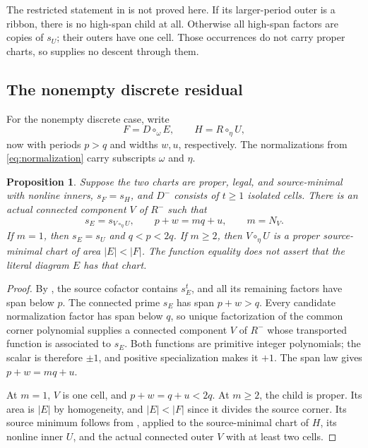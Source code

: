\documentclass[11pt,a4paper]{amsart}
\numberwithin{equation}{section}
\theoremstyle{plain}
\newtheorem{proposition}[theorem]{Proposition}
\theoremstyle{definition}
\begin{document}
The restricted statement in  is not proved here.  If its larger-period outer is a ribbon, there is no high-span child at all.  Otherwise all high-span factors are copies of \(s_U\); their outers have one cell.  Those occurrences do not carry proper charts, so  supplies no descent through them.

\subsection{The nonempty discrete residual}

For the nonempty discrete case, write
\begin{equation*}
 F=D\circ_\omega E,\qquad H=R\circ_\eta U,
\end{equation*}
now with periods \(p>q\) and widths \(w,u\), respectively.  The normalizations from \eqref{eq:normalization} carry subscripts \(\omega\) and \(\eta\).

\begin{proposition}\label{prop:beta-reduction}
Suppose the two charts are proper, legal, and source-minimal with nonline inners, \(s_F=s_H\), and \(D^-\) consists of \(t\ge1\) isolated cells.  There is an actual connected component \(V\) of \(R^-\) such that
\begin{equation*}
 s_E=s_{V\circ_\eta U},\qquad
 p+w=mq+u,\qquad m=N_V.
\end{equation*}
If \(m=1\), then \(s_E=s_U\) and \(q<p<2q\).  If \(m\ge2\), then \(V\circ_\eta U\) is a proper source-minimal chart of area \(|E|<|F|\).  The function equality does not assert that the literal diagram \(E\) has that chart.
\end{proposition}
\begin{proof}
By , the source cofactor contains \(s_E^t\), and all its remaining factors have span below \(p\).  The connected prime \(s_E\) has span \(p+w>q\).  Every candidate normalization factor has span below \(q\), so unique factorization of the common corner polynomial supplies a connected component \(V\) of \(R^-\) whose transported function is associated to \(s_E\).  Both functions are primitive integer polynomials; the scalar is therefore \(\pm1\), and positive specialization makes it \(+1\).  The span law gives \(p+w=mq+u\).

At \(m=1\), \(V\) is one cell, and \(p+w=q+u<2q\).  At \(m\ge2\), the child is proper.  Its area is \(|E|\) by homogeneity, and \(|E|<|F|\) since it divides the source corner.  Its source minimum follows from , applied to the source-minimal chart of \(H\), its nonline inner \(U\), and the actual connected outer \(V\) with at least two cells.
\end{proof}
\end{document}
